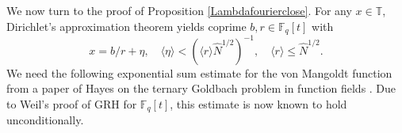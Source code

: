 \documentclass{article}
\theoremstyle{definition}
\theoremstyle{definition}
\theoremstyle{remark}
\newcommand{\F}{\mathbb{F}_q[t]}
\newcommand{\1}{\mathbf{1}}
\numberwithin{equation}{section}
\begin{document}
We now turn to the proof of Proposition \ref{Lambdafourierclose}. For any $x\in \mathbb{T}$, Dirichlet's approximation theorem yields coprime $b,r \in \F$ with 
\begin{equation}\label{dirichletx}
x=b\slash r+\eta, \quad\langle \eta \rangle <(\langle r \rangle \widehat{N}^{1\slash 2})^{-1}, \quad\langle r \rangle \leq \widehat{N}^{1\slash 2}.
\end{equation}
We need the following exponential sum estimate for the von Mangoldt function from a paper of Hayes on the ternary Goldbach problem in function fields \cite{Hayes66}. Due to Weil's proof of GRH for $\F$, this estimate is now known to hold unconditionally. 

\end{document}

